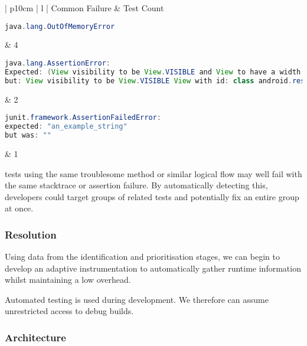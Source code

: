 \begin{center}
    \begin{tabular}{| p{10cm} | l |}
    \hline
    Common Failure & \flaky{} Test Count \\ \hline
    {\begin{lstlisting}[language=Java, numbers=none]
java.lang.OutOfMemoryError
	\end{lstlisting}}
    & 4 \\ \hline
    {\begin{lstlisting}[language=Java, numbers=none]
java.lang.AssertionError:
Expected: (View visibility to be View.VISIBLE and View to have a width and a height)
but: View visibility to be View.VISIBLE View with id: class android.resources.R$id.anExampleView(1) had a visibility of View.GONE
	\end{lstlisting}}
	& 2 \\ \hline
    {\begin{lstlisting}[language=Java, numbers=none]
junit.framework.AssertionFailedError:
expected: "an_example_string"
but was: ""
	\end{lstlisting}}
	& 1 \\ \hline

    \end{tabular}
\end{center}

\flaky{} tests using the same troublesome method or similar logical flow may well fail with the same stacktrace or assertion failure. By automatically detecting this, developers could target groups of related tests and potentially fix an entire group at once.


\subsubsection{Resolution}

Using data from the identification and prioritisation stages, we can begin to develop an adaptive instrumentation to automatically gather runtime information whilst maintaining a low overhead.


Automated testing is used during development. We therefore can assume unrestricted access to debug builds.


\subsubsection{Architecture}

